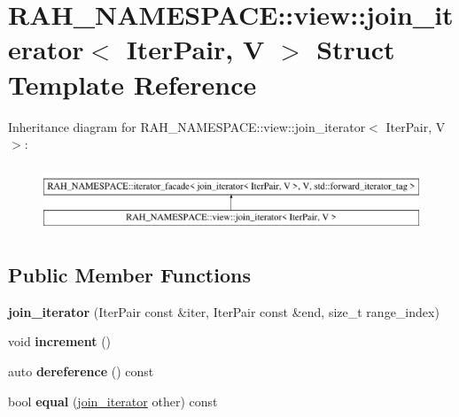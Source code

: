 \hypertarget{struct_r_a_h___n_a_m_e_s_p_a_c_e_1_1view_1_1join__iterator}{}\section{R\+A\+H\+\_\+\+N\+A\+M\+E\+S\+P\+A\+CE\+::view\+::join\+\_\+iterator$<$ Iter\+Pair, V $>$ Struct Template Reference}
\label{struct_r_a_h___n_a_m_e_s_p_a_c_e_1_1view_1_1join__iterator}
Inheritance diagram for R\+A\+H\+\_\+\+N\+A\+M\+E\+S\+P\+A\+CE\+::view\+::join\+\_\+iterator$<$ Iter\+Pair, V $>$\+:\begin{figure}[H]
\begin{center}
\leavevmode
\includegraphics[height=1.992882cm]{struct_r_a_h___n_a_m_e_s_p_a_c_e_1_1view_1_1join__iterator}
\end{center}
\end{figure}
\subsection*{Public Member Functions}
\begin{DoxyCompactItemize}
\item 
\mbox{\label{struct_r_a_h___n_a_m_e_s_p_a_c_e_1_1view_1_1join__iterator_a9667543cbe60443640165c2b0f40e930}} 
{\bfseries join\+\_\+iterator} (Iter\+Pair const \&iter, Iter\+Pair const \&end, size\+\_\+t range\+\_\+index)
\item 
\mbox{\label{struct_r_a_h___n_a_m_e_s_p_a_c_e_1_1view_1_1join__iterator_abcb804717c1e8b2a5fe83dba8f757d28}} 
void {\bfseries increment} ()
\item 
\mbox{\label{struct_r_a_h___n_a_m_e_s_p_a_c_e_1_1view_1_1join__iterator_a767b00208ccd127dc728c35defc526f0}} 
auto {\bfseries dereference} () const
\item 
\mbox{\label{struct_r_a_h___n_a_m_e_s_p_a_c_e_1_1view_1_1join__iterator_a92db3de2df175d2514d72b2ea027c930}} 
bool {\bfseries equal} (\mbox{\hyperlink{struct_r_a_h___n_a_m_e_s_p_a_c_e_1_1view_1_1join__iterator}{join\+\_\+iterator}} other) const
\end{DoxyCompactItemize}
